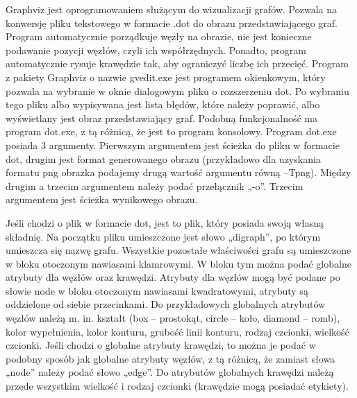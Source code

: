 


Graphviz\cite{Graphviz} jest oprogramowaniem służącym do wizualizacji grafów. Pozwala na konwersję pliku tekstowego w formacie .dot do obrazu przedstawiającego graf. 
Program automatycznie porządkuje węzły na obrazie, nie jest konieczne podawanie pozycji węzłów, czyli ich współrzędnych. Ponadto, program automatycznie rysuje krawędzie tak, aby ograniczyć liczbę ich przecięć. Program z pakiety Graphviz o nazwie gvedit.exe jest programem okienkowym, który pozwala na wybranie w oknie dialogowym pliku o rozszerzeniu dot. Po wybraniu tego pliku albo wypisywana jest lista błędów, które należy poprawić, albo wyświetlany jest obraz przedstawiający graf. Podobną funkcjonalność ma program dot.exe, z tą różnicą, że jest to program konsolowy. Program dot.exe posiada 3 argumenty. Pierwszym argumentem jest ścieżka do pliku w formacie dot, drugim jest format generowanego obrazu (przykładowo dla uzyskania formatu png obrazka podajemy drugą wartość argumentu równą –Tpng). Między drugim a trzecim argumentem należy podać przełącznik „-o”. Trzecim argumentem jest ścieżka wynikowego obrazu. 

Jeśli chodzi o plik w formacie dot, jest to plik, który posiada swoją własną składnię. Na początku pliku umieszczone jest słowo „digraph”, po którym umieszcza się nazwę grafu. Wszystkie pozostałe właściwości grafu są umieszczone w bloku otoczonym nawiasami klamrowymi. W bloku tym można podać globalne atrybuty dla węzłów oraz krawędzi. Atrybuty dla węzłów mogą być podane po słowie node w bloku otoczonym nawiasami kwadratowymi, atrybuty są oddzielone od siebie przecinkami. Do przykładowych globalnych atrybutów węzłów należą m. in. kształt (box – prostokąt, circle – koło, diamond – romb), kolor wypełnienia, kolor konturu, grubość linii konturu, rodzaj czcionki, wielkość czcionki. Jeśli chodzi o globalne atrybuty krawędzi, to można je podać w podobny sposób jak globalne atrybuty węzłów, z tą różnicą, że zamiast słowa „node” należy podać słowo „edge”. Do atrybutów globalnych krawędzi należą przede wszystkim wielkość i rodzaj czcionki (krawędzie mogą posiadać etykiety). 

